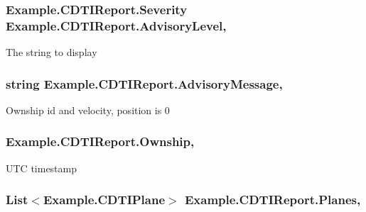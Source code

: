 \subsubsection[{Advisory\+Level}]{\setlength{\rightskip}{0pt plus 5cm}Example.\+C\+D\+T\+I\+Report.\+Severity Example.\+C\+D\+T\+I\+Report.\+Advisory\+Level\hspace{0.3cm}{\ttfamily [get]}, {\ttfamily [set]}}\label{class_example_1_1_c_d_t_i_report_a55ef7e8b3e35eeeb0b273fd3c475ba31}


The string to display

\hypertarget{class_example_1_1_c_d_t_i_report_a6859a3fc5d356d9125d589e23a6cc2b9}{}
\subsubsection[{Advisory\+Message}]{\setlength{\rightskip}{0pt plus 5cm}string Example.\+C\+D\+T\+I\+Report.\+Advisory\+Message\hspace{0.3cm}{\ttfamily [get]}, {\ttfamily [set]}}\label{class_example_1_1_c_d_t_i_report_a6859a3fc5d356d9125d589e23a6cc2b9}


Ownship id and velocity, position is 0

\hypertarget{class_example_1_1_c_d_t_i_report_ad40efe2d19d10dabc930320ba2835337}{}
\subsubsection[{Ownship}]{ Example.\+C\+D\+T\+I\+Report.\+Ownship\hspace{0.3cm}{\ttfamily [get]}, {\ttfamily [set]}}\label{class_example_1_1_c_d_t_i_report_ad40efe2d19d10dabc930320ba2835337}


U\+T\+C timestamp

\hypertarget{class_example_1_1_c_d_t_i_report_a73959c38addf562d6b64ecb538db006a}{}
\subsubsection[{Planes}]{\setlength{\rightskip}{0pt plus 5cm}List$<${\bf Example.\+C\+D\+T\+I\+Plane}$>$ Example.\+C\+D\+T\+I\+Report.\+Planes\hspace{0.3cm}{\ttfamily [get]}, {\ttfamily [set]}}\label{class_example_1_1_c_d_t_i_report_a73959c38addf562d6b64ecb538db006a}



